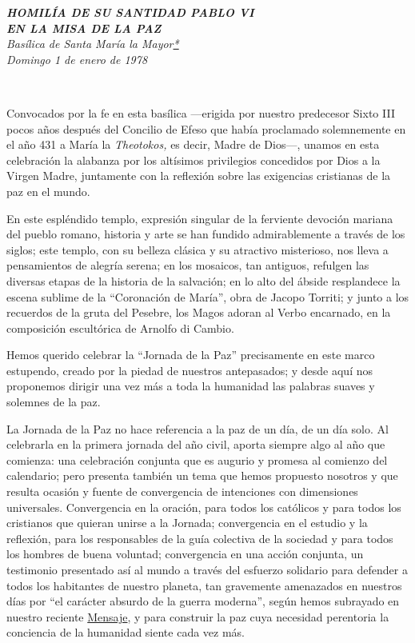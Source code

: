 \emph{\textbf{HOMILÍA DE SU SANTIDAD PABLO VI\\
		EN LA MISA DE LA PAZ}\\[2\baselineskip]Basílica de Santa María la
	Mayor\protect\hyperlink{ux2a}{*}\\
	Domingo 1 de enero de 1978}

~

Convocados por la fe en esta basílica ---erigida por nuestro predecesor
Sixto III pocos años después del Concilio de Efeso que había proclamado
solemnemente en el año 431 a María la \emph{Theotokos,} es decir, Madre
de Dios---, unamos en esta celebración la alabanza por los altísimos
privilegios concedidos por Dios a la Virgen Madre, juntamente con la
reflexión sobre las exigencias cristianas de la paz en el mundo.

En este espléndido templo, expresión singular de la ferviente devoción
mariana del pueblo romano, historia y arte se han fundido admirablemente
a través de los siglos; este templo, con su belleza clásica y su
atractivo misterioso, nos lleva a pensamientos de alegría serena; en los
mosaicos, tan antiguos, refulgen las diversas etapas de la historia de
la salvación; en lo alto del ábside resplandece la escena sublime de la
``Coronación de María'', obra de Jacopo Torriti; y junto a los recuerdos
de la gruta del Pesebre, los Magos adoran al Verbo encarnado, en la
composición escultórica de Arnolfo di Cambio.

Hemos querido celebrar la ``Jornada de la Paz'' precisamente en este
marco estupendo, creado por la piedad de nuestros antepasados; y desde
aquí nos proponemos dirigir una vez más a toda la humanidad las palabras
suaves y solemnes de la paz.

La Jornada de la Paz no hace referencia a la paz de un día, de un día
solo. Al celebrarla en la primera jornada del año civil, aporta siempre
algo al año que comienza: una celebración conjunta que es augurio y
promesa al comienzo del calendario; pero presenta también un tema que
hemos propuesto nosotros y que resulta ocasión y fuente de convergencia
de intenciones con dimensiones universales. Convergencia en la oración,
para todos los católicos y para todos los cristianos que quieran unirse
a la Jornada; convergencia en el estudio y la reflexión, para los
responsables de la guía colectiva de la sociedad y para todos los
hombres de buena voluntad; convergencia en una acción conjunta, un
testimonio presentado así al mundo a través del esfuerzo solidario para
defender a todos los habitantes de nuestro planeta, tan gravemente
amenazados en nuestros días por ``el carácter absurdo de la guerra
moderna'', según hemos subrayado en nuestro reciente
\href{/content/paul-vi/es/messages/peace/documents/hf_p-vi_mes_19771208_xi-world-day-for-peace.html}{Mensaje},
y para construir la paz cuya necesidad perentoria la conciencia de la
humanidad siente cada vez más.

